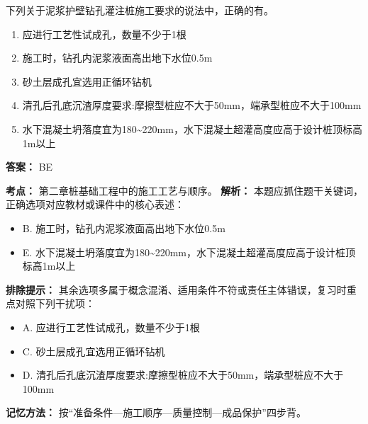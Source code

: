 \documentclass[UTF8,fontset=fandol,11pt]{ctexart}
\begin{document}
\begin{quizbox}[title={第 3 题}]
下列关于泥浆护壁钻孔灌注桩施工要求的说法中，正确的有。\\
\begin{enumerate}[label=\Alph*.]
\item 应进行工艺性试成孔，数量不少于1根
\item 施工时，钻孔内泥浆液面高出地下水位0.5m
\item 砂土层成孔宜选用正循环钻机
\item 清孔后孔底沉渣厚度要求:摩擦型桩应不大于50mm，端承型桩应不大于100mm
\item 水下混凝土坍落度宜为180\textasciitilde{}220mm，水下混凝土超灌高度应高于设计桩顶标高1m以上
\end{enumerate}
\textbf{答案：} BE
\vspace{0.25em}
\begin{answerbox}[title={考点解析}]
\textbf{考点：} 第二章桩基础工程中的施工工艺与顺序。
\textbf{解析：} 本题应抓住题干关键词，正确选项对应教材或课件中的核心表述：
\begin{itemize}
\item B. 施工时，钻孔内泥浆液面高出地下水位0.5m
\item E. 水下混凝土坍落度宜为180\textasciitilde{}220mm，水下混凝土超灌高度应高于设计桩顶标高1m以上
\end{itemize}
\textbf{排除提示：} 其余选项多属于概念混淆、适用条件不符或责任主体错误，复习时重点对照下列干扰项：
\begin{itemize}
\item A. 应进行工艺性试成孔，数量不少于1根
\item C. 砂土层成孔宜选用正循环钻机
\item D. 清孔后孔底沉渣厚度要求:摩擦型桩应不大于50mm，端承型桩应不大于100mm
\end{itemize}
\textbf{记忆方法：} 按“准备条件—施工顺序—质量控制—成品保护”四步背。
\end{answerbox}
\end{quizbox}
\end{document}
